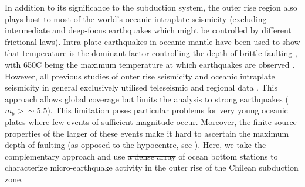 \documentclass[reviewcopy]{elsart}
\providecommand{\DIFadd}[1]{{\protect\color{blue}\uwave{#1}}} %
\providecommand{\DIFdel}[1]{{\protect\color{red}\sout{#1}}}                      %
\providecommand{\DIFaddbegin}{} %
\providecommand{\DIFaddend}{} %
\providecommand{\DIFdelbegin}{} %
\providecommand{\DIFdelend}{} %
\begin{document}
In addition to
its significance to the subduction system, the outer rise region also
plays host to most of the world's oceanic intraplate  seismicity
(excluding intermediate and deep-focus earthquakes which might be
controlled by different frictional laws).  
Intra-plate earthquakes in oceanic mantle have been used to show that
temperature is the dominant factor controlling the
depth of brittle faulting \citep{wiens83}, with 650\dg C being the
maximum temperature at which earthquakes are observed
\citep{mckenzie05}.
However, all previous studies of outer rise seismicity and oceanic
intraplate seismicity in general exclusively utilised teleseismic and
regional data \citep[e.g.][]{wiens83,christensen88}. This approach allows global
  coverage but limits the analysis to strong earthquakes ($m_b>\sim
  5.5$). This limitation poses particular problems for very young
  oceanic plates where few events of sufficient magnitude
  occur.   \DIFdelbegin %
\DIFdelend %
Moreover, the finite source properties of the larger of these events
make it hard to ascertain the maximum depth of faulting (as opposed to
the hypocentre, see \citet{tichelaar92}).
Here, we take the complementary approach and use \DIFdelbegin \DIFdel{a dense array }\DIFdelend \DIFaddbegin \DIFadd{dense arrays }\DIFaddend of
ocean bottom stations to characterize micro-earthquake activity in the
outer rise of the Chilean subduction zone.
\end{document}
